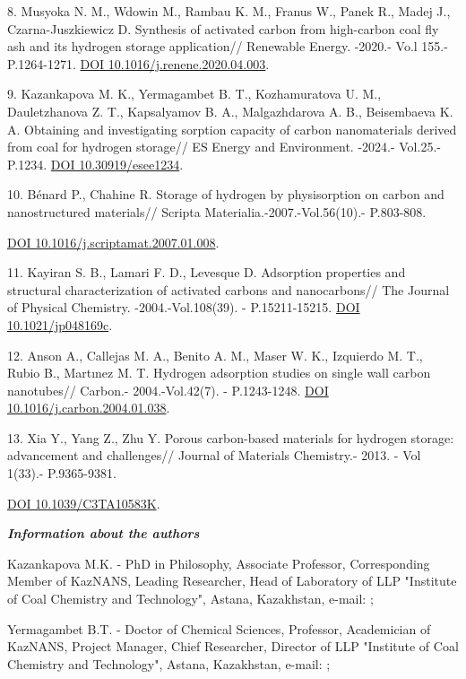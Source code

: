 8. Musyoka N. M., Wdowin M., Rambau K. M., Franus W., Panek R., Madej
J., Czarna-Juszkiewicz D. Synthesis of activated carbon from high-carbon
coal fly ash and its hydrogen storage application// Renewable Energy.
-2020.- Vo.l 155.- P.1264-1271.
\href{https://doi.org/10.1016/j.renene.2020.04.003}{DOI
10.1016/j.renene.2020.04.003}.

9. Kazankapova M. K., Yermagambet B. T., Kozhamuratova U. M.,
Dauletzhanova Z. T., Kapsalyamov B. A., Malgazhdarova A. B., Beisembaeva
K. A. Obtaining and investigating sorption capacity of carbon
nanomaterials derived from coal for hydrogen storage// ES Energy and
Environment. -2024.- Vol.25.- P.1234.
\href{https://dx.doi.org/10.30919/esee1234}{DOI 10.30919/esee1234}.

10. Bénard P., Chahine R. Storage of hydrogen by physisorption on carbon
and nanostructured materials// Scripta Materialia.-2007.-Vol.56(10).-
P.803-808.

\href{https://doi.org/10.1016/j.scriptamat.2007.01.008}{DOI
10.1016/j.scriptamat.2007.01.008}.

11. Kayiran S. B., Lamari F. D., Levesque D. Adsorption properties and
structural characterization of activated carbons and nanocarbons// The
Journal of Physical Chemistry. -2004.-Vol.108(39). - P.15211-15215.
\href{https://doi.org/10.1021/jp048169c}{DOI 10.1021/jp048169c}.

12. Anson A., Callejas M. A., Benito A. M., Maser W. K., Izquierdo M.
T., Rubio B., Martınez M. T. Hydrogen adsorption studies on single wall
carbon nanotubes// Carbon.- 2004.-Vol.42(7). - P.1243-1248.
\href{https://doi.org/10.1016/j.carbon.2004.01.038}{DOI
10.1016/j.carbon.2004.01.038}.

13. Xia Y., Yang Z., Zhu Y. Porous carbon-based materials for hydrogen
storage: advancement and challenges// Journal of Materials Chemistry.-
2013. - Vol 1(33).- P.9365-9381.

\href{https://doi.org/10.1039/C3TA10583K}{DOI 10.1039/C3TA10583K}.

\emph{{\bfseries Information about the authors}}

Kazankapova M.K. - PhD in Philosophy, Associate Professor, Corresponding
Member of KazNANS, Leading Researcher, Head of Laboratory of LLP
"Institute of Coal Chemistry and Technology", Astana, Kazakhstan,
e-mail: \href{mailto:maira_1986@mail.ru}{};

Yermagambet B.T. - Doctor of Chemical Sciences, Professor, Academician
of KazNANS, Project Manager, Chief Researcher, Director of LLP
"Institute of Coal Chemistry and Technology", Astana, Kazakhstan,
e-mail: \href{mailto:bake.yer@mail.ru}{};

